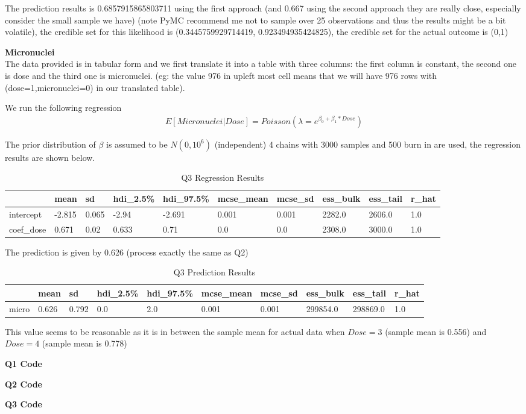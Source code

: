 \documentclass{homeworg}
\begin{document}
The prediction results is 0.6857915865803711 using the first approach (and 0.667 using the second approach they are really close, especially consider the small sample we have) (note PyMC recommend me not to sample over 25 observations and thus the results might be a bit volatile), the credible set for this likelihood is (0.3445759929714419, 0.923494935424825), the credible set for the actual outcome is (0,1)


\exercise 
\textbf{Micronuclei} \\
The data provided is in tabular form and we first translate it into a table with three columns: the first column is constant, the second one is dose and the third one is micronuclei. (eg: the value 976 in upleft most cell means that we will have 976 rows with (dose=1,micronuclei=0) in our translated table).

We run the following regression
\begin{align*}
E[Micronuclei|Dose]=Poisson(\lambda=e^{\beta_0+\beta_1*Dose})
\end{align*}

The prior distribution of $\beta$ is assumed to be $N(0,10^6)$ (independent) 4 chains with 3000 samples and 500 burn in are used, the regression results are shown below. 

\begin{table}[h]
	\caption{Q3 Regression Results}
	\begin{tabular}{llllllllll}
		\hline \hline
		& mean   & sd    & hdi\_2.5\% & hdi\_97.5\% & mcse\_mean & mcse\_sd & ess\_bulk & ess\_tail & r\_hat \\ \hline
		intercept  & -2.815 & 0.065 & -2.94      & -2.691      & 0.001      & 0.001    & 2282.0    & 2606.0    & 1.0    \\
		coef\_dose & 0.671  & 0.02  & 0.633      & 0.71        & 0.0        & 0.0      & 2308.0    & 3000.0    & 1.0   \\ \hline \hline
	\end{tabular}
\end{table}

The prediction is given by 0.626 (process exactly the same as Q2)
\begin{table}[h]
	\caption{Q3 Prediction Results}
	\begin{tabular}{llllllllll}
		\hline \hline 
		& mean  & sd    & hdi\_2.5\% & hdi\_97.5\% & mcse\_mean & mcse\_sd & ess\_bulk & ess\_tail & r\_hat \\ \hline 
		micro & 0.626 & 0.792 & 0.0        & 2.0         & 0.001      & 0.001    & 299854.0  & 298869.0  & 1.0   \\ \hline \hline 
	\end{tabular}
\end{table}
This value seems to be reasonable as it is in between the sample mean for actual data when $Dose=3$ (sample mean is 0.556) and $Dose=4$ (sample mean is 0.778)

%
%


\newpage
\textbf{Q1 Code}

\newpage
\textbf{Q2 Code}

\newpage
\textbf{Q3 Code}

%
\end{document}
